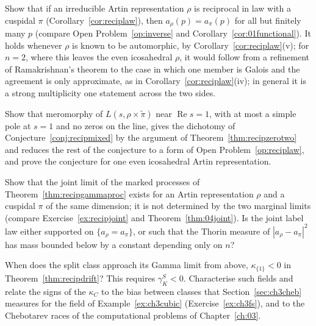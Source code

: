 \begin{problem}\label{op:reciplaw}
Show that if an irreducible Artin representation $\rho$ is reciprocal in law with a cuspidal $\pi$ (Corollary~\ref{cor:reciplaw}), then $a_\rho(p)=a_\pi(p)$ for all but finitely many $p$ (compare Open Problem~\ref{op:inverse} and Corollary~\ref{cor:01functional}). It holds whenever $\rho$ is known to be automorphic, by Corollary~\ref{cor:reciplaw}(v); for $n=2$, where this leaves the even icosahedral $\rho$, it would follow from a refinement of Ramakrishnan's theorem \cite{ramakrishnan1994} to the case in which one member is Galois and the agreement is only approximate, as in Corollary~\ref{cor:reciplaw}(iv); in general it is a strong multiplicity one statement across the two sides.
\end{problem}

\begin{problem}\label{op:recipmixed}
Show that meromorphy of $L(s,\rho\times\tilde\pi)$ near $\operatorname{Re}s=1$, with at most a simple pole at $s=1$ and no zeros on the line, gives the dichotomy of Conjecture~\ref{conj:recipmixed} by the argument of Theorem~\ref{thm:recipzerotwo} and reduces the rest of the conjecture to a form of Open Problem~\ref{op:reciplaw}, and prove the conjecture for one even icosahedral Artin representation.
\end{problem}

\begin{problem}\label{op:recipjoint}
Show that the joint limit of the marked processes of Theorem~\ref{thm:recipgammaproc} exists for an Artin representation $\rho$ and a cuspidal $\pi$ of the same dimension; it is not determined by the two marginal limits (compare Exercise~\ref{ex:recipjoint} and Theorem~\ref{thm:04joint}). Is the joint label law either supported on $\{a_\rho=a_\pi\}$, or such that the Thorin measure of $|a_\rho-a_\pi|^2$ has mass bounded below by a constant depending only on $n$?
\end{problem}

\begin{problem}\label{op:recipdrift}
When does the split class approach its Gamma limit from above, $\kappa_{\{1\}}<0$ in Theorem~\ref{thm:recipdrift}? This requires $\gamma_K^S<0$. Characterise such fields and relate the signs of the $\kappa_C$ to the bias between classes that Section~\ref{sec:ch3cheb} measures for the field of Example~\ref{ex:ch3cubic} (Exercise~\ref{ex:ch3fs}), and to the Chebotarev races of the computational problems of Chapter~\ref{ch:03}.
\end{problem}

